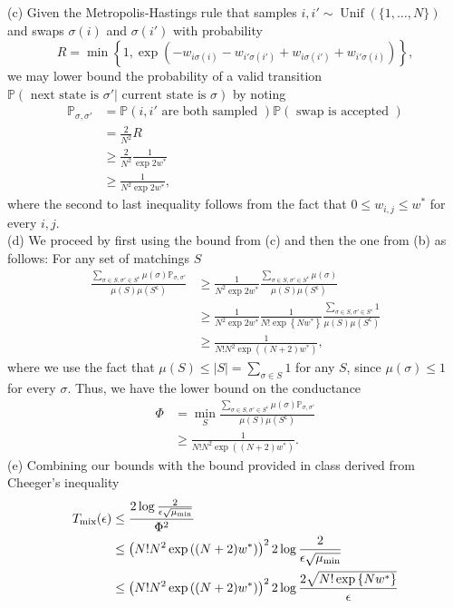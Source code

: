 \documentclass[10pt,onecolumn,letterpaper]{article}
\begin{document}
(c) Given the Metropolis-Hastings rule that samples $i,i'\sim\operatorname{Unif}(\{1,\dotsc, N\})$ and swaps $\sigma(i)$ and $\sigma(i')$ with probability
\begin{equation*}
 R = \min\left\{1, \exp(-w_{i\sigma(i)}-w_{i'\sigma(i')}+w_{i\sigma(i')}+w_{i'\sigma(i)}) \right\},
\end{equation*}
we may lower bound the probability of a valid transition $\mathbb{P}(\text{ next state is }\sigma'|\text{ current state is }\sigma)$ by noting
\begin{align*}
\mathbb{P}_{\sigma,\sigma'}&=\mathbb{P}(i, i'\text{ are both sampled })\mathbb{P}(\text{ swap is accepted })\\
&=\frac{2}{N^2}R\\
&\geq\frac{2}{N^2}\frac{1}{\exp{2w^*}}\\
&\geq\frac{1}{N^2\exp{2w^*}},
\end{align*}
where the second to last inequality follows from the fact that $0\leq w_{i,j} \leq w^*$ for every $i,j$.\\
(d) We proceed by first using the bound from (c) and then the one from (b) as follows: For any set of matchings $S$
\begin{align*}
  \frac{\sum_{\sigma\in S,\sigma'\in S^\mathsf{c}}\mu(\sigma)\mathbb{P}_{\sigma,\sigma'}}{\mu(S)\mu(S^\mathsf{c})}&\geq\frac{1}{N^2\exp{2w^*}}\frac{\sum_{\sigma\in S,\sigma'\in S^\mathsf{c}}\mu(\sigma)}{\mu(S)\mu(S^\mathsf{c})}\\
  &\geq\frac{1}{N^2\exp{2w^*}}\frac{1}{N!\exp\left\{Nw^*\right\}}\frac{\sum_{\sigma\in S,\sigma'\in S^\mathsf{c}}1}{\mu(S)\mu(S^\mathsf{c})}\\
  &\geq\frac{1}{N!N^2\exp{((N+2)w^*)}},
\end{align*}
where we use the fact that $\mu(S)\leq|S|=\sum_{\sigma\in S}1$ for any $S$, since $\mu(\sigma)\leq 1$ for every $\sigma$. Thus, we have the lower bound on the conductance
\begin{align*}
\Phi &= \min_S\frac{\sum_{\sigma\in S,\sigma'\in S^\mathsf{c}}\mu(\sigma)\mathbb{P}_{\sigma,\sigma'}}{\mu(S)\mu(S^\mathsf{c})}\\
&\geq\frac{1}{N!N^2\exp{((N+2)w^*)}}.
\end{align*}
(e) Combining our bounds with the bound provided in class derived from Cheeger's inequality
\begin{align*}
   T_{\rm mix}(\epsilon)&\leq\frac{2\log\frac{2}{\epsilon\sqrt{\mu_{\rm min}}}}{\Phi^2}\\
   &\leq\left(N!N^2\exp{((N+2)w^*)}\right)^22\log\frac{2}{\epsilon\sqrt{\mu_{\rm min}}}\\
   &\leq\left(N!N^2\exp{((N+2)w^*)}\right)^22\log\frac{2\sqrt{N!\exp\left\{Nw^*\right\}}}{\epsilon}
\end{align*}\\
\end{document}
